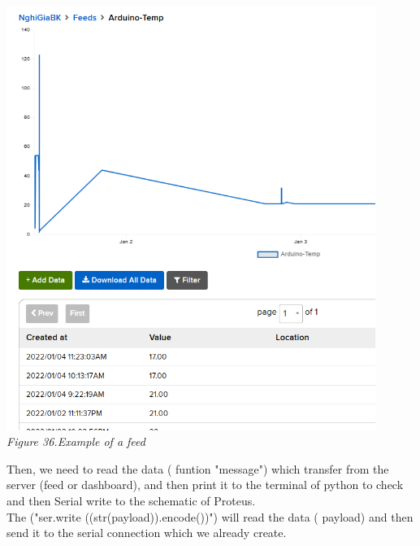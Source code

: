 \documentclass[a4paper]{article}
\begin{document}
\begin{center}
    \includegraphics[width=12cm]{pictures/Feeds.png}\\
    \textit{Figure 36.Example of a feed}\\
\end{center}
Then, we need to read the data ( funtion "message") which transfer from the server (feed or dashboard), and then print it to the terminal of python to check and then Serial write to the schematic of Proteus. \\
The ("ser.write ((str(payload)).encode())")  will read the data ( payload) and then send it to the serial connection which we already create.\\ 
\newpage
\end{document}
